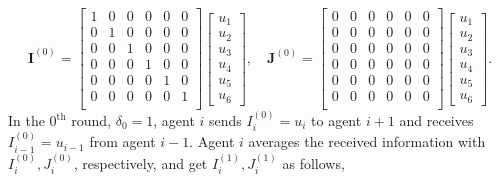 \documentclass{article}
\newcommand{\vI}{\mathbf{I}}
\newcommand{\vJ}{\mathbf{J}}
\theoremstyle{plain}
\theoremstyle{definition}
\begin{document}
$$
\vI^{(0)}
=
\left[
\begin{array}{cccccc}
    1 & 0 & 0 & 0 & 0 & 0 \\
    0 & 1 & 0 & 0 & 0 & 0 \\
    0 & 0 & 1 & 0 & 0 & 0 \\
    0 & 0 & 0 & 1 & 0 & 0 \\
    0 & 0 & 0 & 0 & 1 & 0 \\
    0 & 0 & 0 & 0 & 0 & 1 \\
\end{array}
\right]
\left[
\begin{array}{c}
     u_1  \\
     u_2  \\
     u_3  \\
     u_4  \\
     u_5  \\
     u_6
\end{array}
\right],\quad
\vJ^{(0)}
=
\left[
\begin{array}{cccccc}
    0 & 0 & 0 & 0 & 0 & 0 \\
    0 & 0 & 0 & 0 & 0 & 0 \\
    0 & 0 & 0 & 0 & 0 & 0 \\
    0 & 0 & 0 & 0 & 0 & 0 \\
    0 & 0 & 0 & 0 & 0 & 0 \\
    0 & 0 & 0 & 0 & 0 & 0 \\
\end{array}
\right]
\left[
\begin{array}{c}
     u_1  \\
     u_2  \\
     u_3  \\
     u_4  \\
     u_5  \\
     u_6
\end{array}
\right].
$$
In the $0^{\text{th}}$ round, $\delta_0=1$, agent $i$ sends $I^{(0)}_i=u_i$ to agent $i+1$ and receives $I^{(0)}_{i-1}=u_{i-1}$ from agent $i-1$. Agent $i$ averages the received information with $I^{(0)}_i, J^{(0)}_i$, respectively, and get  $I^{(1)}_i, J^{(1)}_i$ as follows,
\begingroup
\renewcommand{\arraystretch}{1.2} %
\end{document}
